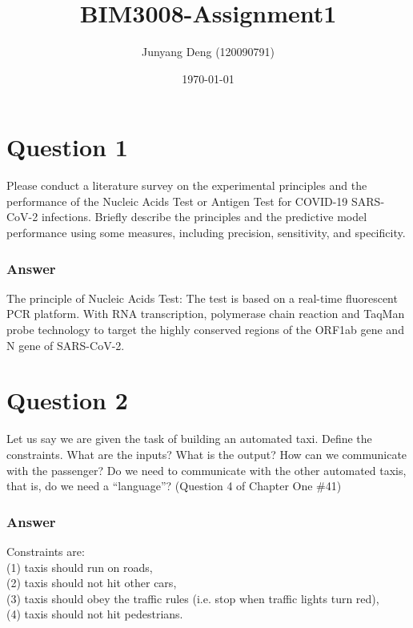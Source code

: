 \documentclass{article}
\title{BIM3008-Assignment1}
\author{Junyang Deng (120090791)}
\date{\today}
\begin{document}
 

\maketitle

\section*{Question 1}
Please conduct a literature survey on the experimental principles and the performance of the Nucleic Acids Test or Antigen Test for COVID-19 SARS-CoV-2 infections. Briefly describe the principles and the predictive model performance using some measures, including precision, sensitivity, and specificity.
\subsubsection*{Answer}
The principle of Nucleic Acids Test: The test is based on a real-time fluorescent PCR platform. With RNA transcription, polymerase chain reaction and TaqMan probe technology to target the highly conserved regions of the ORF1ab gene and N gene of SARS-CoV-2.




\section*{Question 2}
Let us say we are given the task of building an automated taxi. Define the constraints. What are the inputs? What is the output? How can we communicate with the passenger? Do we need to communicate with the other automated taxis, that is, do we need a “language”? (Question 4 of Chapter One \#41)
\subsubsection*{Answer}

Constraints are: \\(1) taxis should run on roads,\\ 
(2) taxis should not hit other cars, \\
(3) taxis should obey the traffic rules (i.e. stop when traffic lights turn red), \\
(4) taxis should not hit pedestrians.\\
\end{document}
